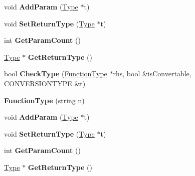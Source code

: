 \begin{DoxyCompactItemize}
\item 
\hypertarget{classFunctionType_a9259c94250b6cb903c6013bc10a0b7bc}{void {\bfseries Add\-Param} (\hyperlink{classType}{Type} $\ast$t)}\label{classFunctionType_a9259c94250b6cb903c6013bc10a0b7bc}

\item 
\hypertarget{classFunctionType_a1462775c5732b70b07c689ab7088814d}{void {\bfseries Set\-Return\-Type} (\hyperlink{classType}{Type} $\ast$t)}\label{classFunctionType_a1462775c5732b70b07c689ab7088814d}

\item 
\hypertarget{classFunctionType_a8b6fed7ff4d79b5db3d39cd042326090}{int {\bfseries Get\-Param\-Count} ()}\label{classFunctionType_a8b6fed7ff4d79b5db3d39cd042326090}

\item 
\hypertarget{classFunctionType_a601e763553086c0d7a4c2de97d6de2bc}{\hyperlink{classType}{Type} $\ast$ {\bfseries Get\-Return\-Type} ()}\label{classFunctionType_a601e763553086c0d7a4c2de97d6de2bc}

\item 
\hypertarget{classFunctionType_a150840d05c02a26ca776aad22e0deed1}{bool {\bfseries Check\-Type} (\hyperlink{classFunctionType}{Function\-Type} $\ast$rhs, bool \&is\-Convertable, C\-O\-N\-V\-E\-R\-S\-I\-O\-N\-T\-Y\-P\-E \&t)}\label{classFunctionType_a150840d05c02a26ca776aad22e0deed1}

\item 
\hypertarget{classFunctionType_a924981ea6fc18a7a9ed4cb5c94a136d6}{{\bfseries Function\-Type} (string n)}\label{classFunctionType_a924981ea6fc18a7a9ed4cb5c94a136d6}

\item 
\hypertarget{classFunctionType_a9259c94250b6cb903c6013bc10a0b7bc}{void {\bfseries Add\-Param} (\hyperlink{classType}{Type} $\ast$t)}\label{classFunctionType_a9259c94250b6cb903c6013bc10a0b7bc}

\item 
\hypertarget{classFunctionType_a1462775c5732b70b07c689ab7088814d}{void {\bfseries Set\-Return\-Type} (\hyperlink{classType}{Type} $\ast$t)}\label{classFunctionType_a1462775c5732b70b07c689ab7088814d}

\item 
\hypertarget{classFunctionType_a8b6fed7ff4d79b5db3d39cd042326090}{int {\bfseries Get\-Param\-Count} ()}\label{classFunctionType_a8b6fed7ff4d79b5db3d39cd042326090}

\item 
\hypertarget{classFunctionType_a601e763553086c0d7a4c2de97d6de2bc}{\hyperlink{classType}{Type} $\ast$ {\bfseries Get\-Return\-Type} ()}\label{classFunctionType_a601e763553086c0d7a4c2de97d6de2bc}


\end{DoxyCompactItemize}
